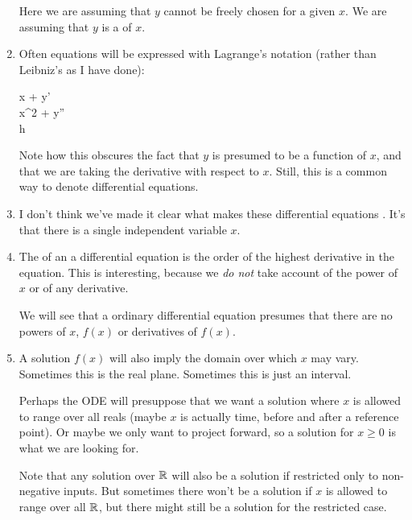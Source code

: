 \documentclass[11pt, oneside]{amsart}
\begin{document}
\begin{enumerate}
  \noindent
  Here we are assuming that $y$ cannot be freely chosen for a given $x$.
  We are assuming that $y$ is a  of $x$.

  \item Often equations will be expressed with Lagrange's notation
  (rather than Leibniz's as I have done):

  \begin{nedqn}
    x + y'
  \\
    x^2 + y''
  \\
    h
  \end{nedqn}

  \noindent
  Note how this obscures the fact that $y$ is presumed to be a function
  of $x$, and that we are taking the derivative with respect to $x$.
  Still, this is a common way to denote differential equations.

  \item I don't think we've made it clear what makes these differential
  equations . It's that there is a single independent
  variable $x$.

  \item The  of an a differential equation is the order of
  the highest derivative in the equation. This is interesting, because
  we \emph{do not} take account of the power of $x$ or of any
  derivative.

  We will see that a  ordinary differential equation
  presumes that there are no powers of $x$, $f(x)$ or derivatives of
  $f(x)$.

  \item A solution $f(x)$ will also imply the domain over which $x$ may
  vary. Sometimes this is the real plane. Sometimes this is just an
  interval.

  Perhaps the ODE will presuppose that we want a solution where $x$ is
  allowed to range over all reals (maybe $x$ is actually time, before
  and after a reference point). Or maybe we only want to project
  forward, so a solution for $x \geq 0$ is what we are looking for.

  Note that any solution over $\mathbb{R}$ will also be a solution if restricted
  only to non-negative inputs. But sometimes there won't be a solution
  if $x$ is allowed to range over all $\mathbb{R}$, but there might still be a
  solution for the restricted case.


\end{enumerate}
\end{document}
